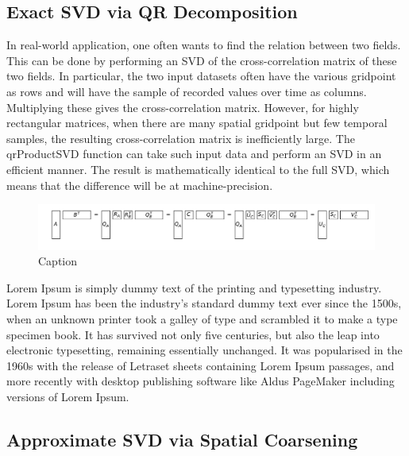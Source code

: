 \documentclass{acm_proc_article-sp}
\begin{document}
\subsection{Exact SVD via QR Decomposition}
\label{sec:Techniques Exact SVD via QR Decomposition}

In real-world application, one often wants to find the relation between two fields. This can be done by performing an SVD of the cross-correlation matrix of these two fields. In particular, the two input datasets often have the various gridpoint as rows and will have the sample of recorded values over time as columns. Multiplying these gives the cross-correlation matrix. However, for highly rectangular matrices, when there are many spatial gridpoint but few temporal samples, the resulting cross-correlation matrix is inefficiently large. The qrProductSVD function can take such input data and perform an SVD in an efficient manner. The result is mathematically identical to the full SVD, which means that the difference will be at machine-precision.

\begin{figure}[h]
\begin{center}
\includegraphics[scale=0.25]{Results/qrProductSVD.pdf}
\caption[Small caption]{Caption}
\label{fig:qrProductSVD}
\end{center}
\end{figure}

Lorem Ipsum is simply dummy text of the printing and typesetting industry. Lorem Ipsum has been the industry's standard dummy text ever since the 1500s, when an unknown printer took a galley of type and scrambled it to make a type specimen book. It has survived not only five centuries, but also the leap into electronic typesetting, remaining essentially unchanged. It was popularised in the 1960s with the release of Letraset sheets containing Lorem Ipsum passages, and more recently with desktop publishing software like Aldus PageMaker including versions of Lorem Ipsum.

\subsection{Approximate SVD via Spatial Coarsening}
\label{sec:Techniques Approximate SVD via Spatial Coarsening}
\end{document}
